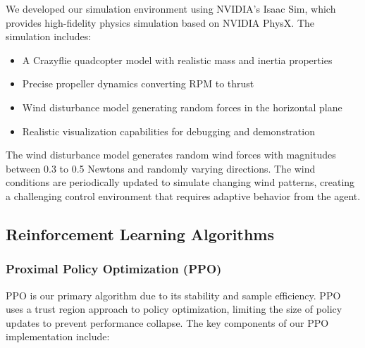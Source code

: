 \documentclass[12pt]{article}
\begin{document}
We developed our simulation environment using NVIDIA's Isaac Sim, which provides high-fidelity physics simulation based on NVIDIA PhysX. The simulation includes:


\begin{itemize}
    \item A Crazyflie quadcopter model with realistic mass and inertia properties
    \item Precise propeller dynamics converting RPM to thrust
    \item Wind disturbance model generating random forces in the horizontal plane
    \item Realistic visualization capabilities for debugging and demonstration
\end{itemize}


The wind disturbance model generates random wind forces with magnitudes between 0.3 to 0.5 Newtons and randomly varying directions. The wind conditions are periodically updated to simulate changing wind patterns, creating a challenging control environment that requires adaptive behavior from the agent.


\subsection{Reinforcement Learning Algorithms}
\subsubsection{Proximal Policy Optimization (PPO)}

PPO is our primary algorithm due to its stability and sample efficiency. PPO uses a trust region approach to policy optimization, limiting the size of policy updates to prevent performance collapse. The key components of our PPO implementation include:
\end{document}
